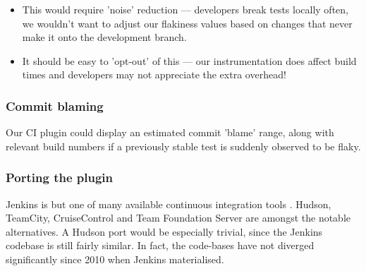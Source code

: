 \begin{itemize}
	\item This would require 'noise' reduction --- developers break tests locally often, we wouldn't want to adjust our flakiness values based on changes that never make it onto the development branch.
	\item It should be easy to 'opt-out' of this --- our instrumentation does affect build times and developers may not appreciate the extra overhead!
\end{itemize}

\subsubsection{Commit blaming}

Our CI plugin could display an estimated commit 'blame' range, along with relevant build numbers if a previously stable test is suddenly observed to be flaky.

\subsubsection{Porting the plugin}

Jenkins is but one of many available continuous integration tools \cite{ContinuousIntegrationSoftware}. Hudson, TeamCity, CruiseControl and Team Foundation Server are amongst the notable alternatives. A Hudson port would be especially trivial, since the Jenkins codebase is still fairly similar. In fact, the code-bases have not diverged significantly since 2010 when Jenkins materialised.

